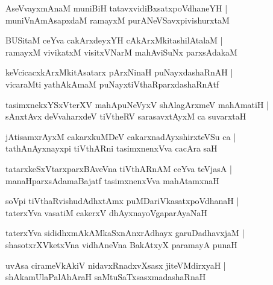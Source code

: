 \documentclass[twoside,12pt,openright]{book}
\newcounter{shloka}[chapter]
\begin{document}
\begin{shloka}%
AseVvayxmAnaM muniBiH tatavxvidiBxsatxpoVdhaneYH |\\
muniVnAmAsapxdaM ramayxM purANeVSavxpivishurxtaM 
\end{shloka}

\begin{shloka}%
BUSitaM ceYva cakArxdeyxYH cAkArxMkitashilAtalaM |\\
ramayxM vivikatxM visitxVNarM mahAviSuNx parxsAdakaM 
\end{shloka}

\begin{shloka}%
keVcicacxkArxMkitAsatarx  pArxNinaH puNayxdashaRnAH |\\
vicaraMti yathAkAmaM  puNayxtiVthaRparxdashaRnAtf 
\end{shloka}

\begin{shloka}%
tasimxnekxYSxVterXV mahApuNeVyxV shAlagArxmeV mahAmatiH |\\
sAnxtAvx deVvaharxdeV tiVtheRV sarasavxtAyxM ca suvarxtaH 
\end{shloka}

\begin{shloka}%
jAtisamxrAyxM cakarxkuMDeV cakarxnadAyxshirxteVSu ca |\\
tathAnAyxnayxpi tiVthARni tasimxnenxVva cacAra saH 
\end{shloka}

\begin{shloka}%
tatarxkeSxVtarxparxBAveVna tiVthARnAM ceYva teVjasA |\\
manaHparxsAdamaBajatf tasimxnenxVva mahAtamxnaH 
\end{shloka}

\begin{shloka}%
soVpi tiVthaRvishudAdhxtAmx puMDariVkasatxpoVdhanaH |\\
taterxYva vasatiM cakerxV dhAyxnayoVgaparAyaNaH
\end{shloka}

\begin{shloka}%
taterxYva sididhxmAkAMkaSxnAnxrAdhayx garuDadhavxjaM |\\
shasotxrXVketxVna vidhAneVna BakAtxyX paramayA punaH 
\end{shloka}

\begin{shloka}%
uvAsa cirameVkAkiV nidavxRnadxvXsasx jiteVMdirxyaH |\\
shAkamUlaPalAhAraH saMtuSaTxsasxmadashaRnaH 
\end{shloka}
\end{document}
